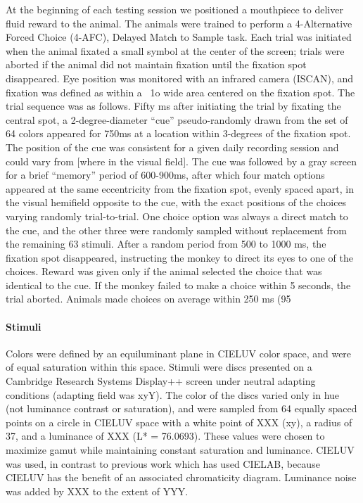 At the beginning of each testing session we positioned a mouthpiece to deliver fluid reward to the animal. The animals were trained to perform a 4-Alternative Forced Choice (4-AFC), Delayed Match to Sample task. Each trial was initiated when the animal fixated a small symbol at the center of the screen; trials were aborted if the animal did not maintain fixation until the fixation spot disappeared. Eye position was monitored with an infrared camera (ISCAN), and fixation was defined as within a ~1o wide area centered on the fixation spot. The trial sequence was as follows. Fifty ms after initiating the trial by fixating the central spot, a 2-degree-diameter “cue” pseudo-randomly drawn from the set of 64 colors appeared for 750ms at a location within 3-degrees of the fixation spot. The position of the cue was consistent for a given daily recording session and could vary from [where in the visual field]. The cue was followed by a gray screen for a brief “memory” period of 600-900ms, after which four match options appeared at the same eccentricity from the fixation spot, evenly spaced apart, in the visual hemifield opposite to the cue, with the exact positions of the choices varying randomly trial-to-trial. One choice option was always a direct match to the cue, and the other three were randomly sampled without replacement from the remaining 63 stimuli. After a random period from 500 to 1000 ms, the fixation spot disappeared, instructing the monkey to direct its eyes to one of the choices. Reward was given only if the animal selected the choice that was identical to the cue. If the monkey failed to make a choice within 5 seconds, the trial aborted. Animals made choices on average within 250 ms (95%

\paragraph{Stimuli}
Colors were defined by an equiluminant plane in CIELUV color space, and were of equal saturation within this space. Stimuli were discs presented on a Cambridge Research Systems Display++ screen under neutral adapting conditions (adapting field was xyY). The color of the discs varied only in hue (not luminance contrast or saturation), and were sampled from 64 equally spaced points on a circle in CIELUV space with a white point of XXX (xy), a radius of 37, and a luminance of XXX (L* = 76.0693). These values were chosen to maximize gamut while maintaining constant saturation and luminance. CIELUV was used, in contrast to previous work which has used CIELAB, because CIELUV has the benefit of an associated chromaticity diagram. Luminance noise was added by XXX to the extent of YYY. 

